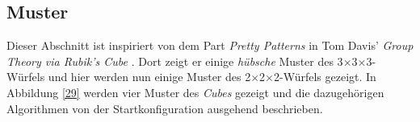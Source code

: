 \documentclass[12pt,a4paper, usenames, dvipsnames]{article}
\theoremstyle{mystyle}
\theoremstyle{definition}
\newcommand{\Ttwo}{2$\times$2$\times$2-}
\newcommand{\Tthree}{3$\times$3$\times$3-}
\begin{document}
%
%
%
%
%
%
%
%
%
%
%
%
%
%
%
%
%
%
%
\subsection*{Muster}
Dieser Abschnitt ist inspiriert von dem Part \textit{Pretty Patterns} in Tom Davis' \textit{Group Theory via Rubik's Cube} \cite{TD}.
Dort zeigt er einige \textit{hübsche} Muster des \Tthree Würfels und hier werden nun einige Muster des \Ttwo Würfels gezeigt.
In Abbildung \ref{29} werden vier Muster des \textit{Cubes} gezeigt und die dazugehörigen Algorithmen von der Startkonfiguration ausgehend beschrieben.

\begin{figure}[h]
\centering
\begin{tabular}{cc}

\end{tabular}
\end{figure}
\end{document}

